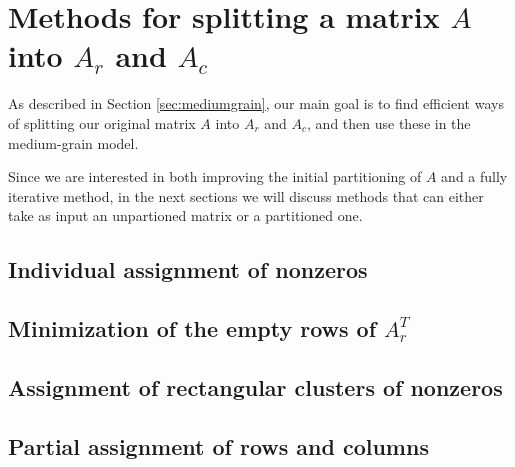 \chapter{Methods for splitting a matrix $A$ into $A_r$ and $A_c$} \label{chap:methods}

As described in Section \ref{sec:mediumgrain}, our main goal is to find efficient ways of splitting our original matrix $A$ into $A_r$ and $A_c$, and then use these in the medium-grain model.

Since we are interested in both improving the initial partitioning of $A$ and a fully iterative method, in the next sections we will discuss methods that can either take as input an unpartioned matrix or a partitioned one.

\section{Individual assignment of nonzeros} \label{sec:localview}

\section{Minimization of the empty rows of $A_r^T$} \label{sec:globalview}
\section{Assignment of rectangular clusters of nonzeros} \label{sec:sbd}
\section{Partial assignment of rows and columns} \label{sec:hot_restart}
